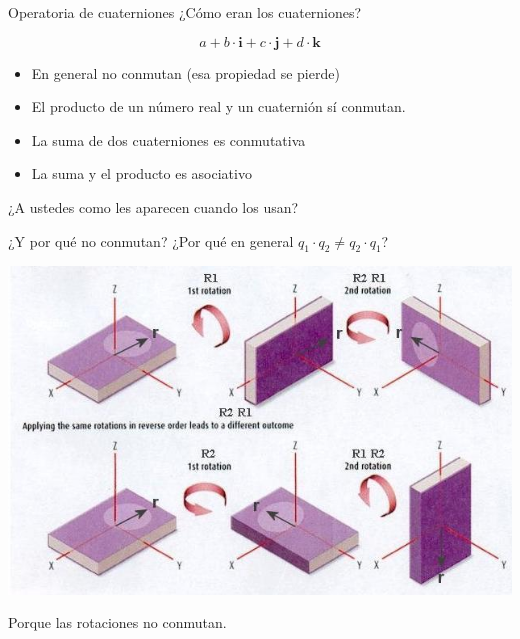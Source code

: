 \documentclass[10pt]{beamer}
\def\ii{\textbf{i}}
\def\jj{\textbf{j}}
\def\kk{\textbf{k}}
\begin{document}
\begin{frame}{Operatoria de cuaterniones}
¿Cómo eran los cuaterniones? 

$$a + b \cdot \ii + c \cdot \jj + d \cdot \kk$$




\begin{itemize}
        \item En general no conmutan (esa propiedad se pierde)
		\item El producto de un número real y un cuaternión sí conmutan.
		\item La suma de dos cuaterniones es conmutativa
		\item La suma y el producto es asociativo		
\end{itemize} 

¿A ustedes como les aparecen cuando los usan?
	
\end{frame}

\begin{frame}{¿Y por qué no conmutan?}
    ¿Por qué en general $q_1 \cdot q_2 \neq q_2 \cdot q_1$? 
    
    \includegraphics[scale=0.6]{dontcommute.jpg}
    
    Porque las rotaciones no conmutan.
    
\end{frame}
\end{document}
